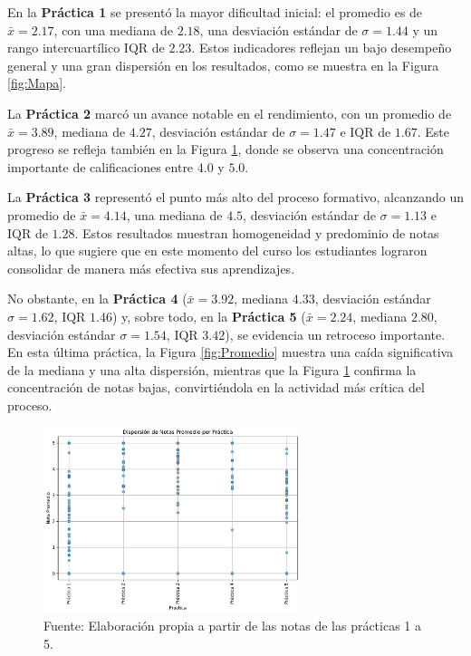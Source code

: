 \documentclass[letter,oneside,12pt,spanish]{report}
\begin{document}
En la \textbf{Práctica 1} se presentó la mayor dificultad inicial: el  promedio es de $\bar{x}=2.17$, con una mediana de $2.18$, una desviación estándar de $\sigma=1.44$ y un rango intercuartílico $\text{IQR}$ de $2.23$. Estos indicadores reflejan un bajo desempeño general y una gran dispersión en los resultados, como se muestra en la Figura \ref{fig:Mapa}.

La \textbf{Práctica 2} marcó un avance notable en el rendimiento, con un promedio de $\bar{x}=3.89$, mediana de $4.27$, desviación estándar de $\sigma=1.47$ e $\text{IQR}$ de $1.67$. Este progreso se refleja también en la Figura \ref{fig:Dispersion}, donde se observa una concentración importante de calificaciones entre $4.0$ y $5.0$.

La \textbf{Práctica 3} representó el punto más alto del proceso formativo, alcanzando un promedio de $\bar{x}=4.14$, una mediana de $4.5$, desviación estándar de $\sigma=1.13$ e $\text{IQR}$ de $1.28$. Estos resultados muestran homogeneidad y predominio de notas altas, lo que sugiere que en este momento del curso los estudiantes lograron consolidar de manera más efectiva sus aprendizajes.

No obstante, en la \textbf{Práctica 4} ($\bar{x}=3.92$, mediana $4.33$, desviación estándar $\sigma=1.62$, $\text{IQR}$ $1.46$) y, sobre todo, en la \textbf{Práctica 5} ($\bar{x}=2.24$, mediana $2.80$, desviación estándar $\sigma=1.54$, $\text{IQR}$ $3.42$), se evidencia un retroceso importante. En esta última práctica, la Figura \ref{fig:Promedio} muestra una caída significativa de la mediana y una alta dispersión, mientras que la Figura \ref{fig:Dispersion} confirma la concentración de notas bajas, convirtiéndola en la actividad más crítica del proceso.

\begin{figure}[ht]
	\centering
	\includegraphics[width=0.67\textwidth]{Figs/Dispersion_Notas.pdf}
	\label{fig:Dispersion}
	\\Fuente: Elaboración propia a partir de las notas de las prácticas 1 a 5.
\end{figure}
\end{document}
